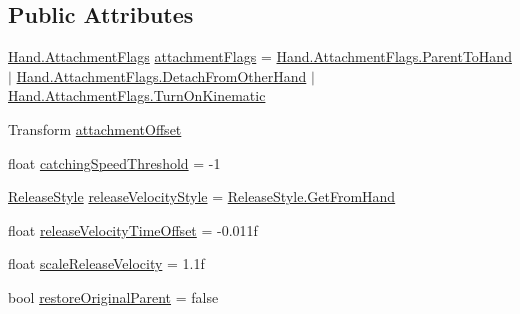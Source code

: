 \subsection*{Public Attributes}
\begin{DoxyCompactItemize}
\item 
\mbox{\hyperlink{class_valve_1_1_v_r_1_1_interaction_system_1_1_hand_a61701f82b8f3fac8818954ec71804cb5}{Hand.\+Attachment\+Flags}} \mbox{\hyperlink{class_valve_1_1_v_r_1_1_interaction_system_1_1_throwable_ae9660f75eeae3bc5c0d0d4883ea0e667}{attachment\+Flags}} = \mbox{\hyperlink{class_valve_1_1_v_r_1_1_interaction_system_1_1_hand_a61701f82b8f3fac8818954ec71804cb5a751b8279634ea59f595145c90a54d8bc}{Hand.\+Attachment\+Flags.\+Parent\+To\+Hand}} $\vert$ \mbox{\hyperlink{class_valve_1_1_v_r_1_1_interaction_system_1_1_hand_a61701f82b8f3fac8818954ec71804cb5a8a58e6540a6a37ae53f78af6e282acb2}{Hand.\+Attachment\+Flags.\+Detach\+From\+Other\+Hand}} $\vert$ \mbox{\hyperlink{class_valve_1_1_v_r_1_1_interaction_system_1_1_hand_a61701f82b8f3fac8818954ec71804cb5a8b6d63187f9074786daaf44d2e4b657d}{Hand.\+Attachment\+Flags.\+Turn\+On\+Kinematic}}
\item 
Transform \mbox{\hyperlink{class_valve_1_1_v_r_1_1_interaction_system_1_1_throwable_afaf5441c0787a5dfd7672c1ad6a279c0}{attachment\+Offset}}
\item 
float \mbox{\hyperlink{class_valve_1_1_v_r_1_1_interaction_system_1_1_throwable_ab955499f5c483d693bb20c69e0d52cc2}{catching\+Speed\+Threshold}} = -\/1
\item 
\mbox{\hyperlink{namespace_valve_1_1_v_r_1_1_interaction_system_a4d44088760d96c5718173d8ca2c48ad1}{Release\+Style}} \mbox{\hyperlink{class_valve_1_1_v_r_1_1_interaction_system_1_1_throwable_a86e0cdec8d857c57f29b83b7e9bffa29}{release\+Velocity\+Style}} = \mbox{\hyperlink{namespace_valve_1_1_v_r_1_1_interaction_system_a4d44088760d96c5718173d8ca2c48ad1ab60a6ddd9cc9eff76f80622812edbbd7}{Release\+Style.\+Get\+From\+Hand}}
\item 
float \mbox{\hyperlink{class_valve_1_1_v_r_1_1_interaction_system_1_1_throwable_a24b452ac7877e0ff3a713fdf3a4301ae}{release\+Velocity\+Time\+Offset}} = -\/0.\+011f
\item 
float \mbox{\hyperlink{class_valve_1_1_v_r_1_1_interaction_system_1_1_throwable_a0f4aa8b227aa10ddb50a23314a7a55a1}{scale\+Release\+Velocity}} = 1.\+1f
\item 
bool \mbox{\hyperlink{class_valve_1_1_v_r_1_1_interaction_system_1_1_throwable_ac45418f7f469d63e566ca1cfa6b4a9cf}{restore\+Original\+Parent}} = false

\end{DoxyCompactItemize}
